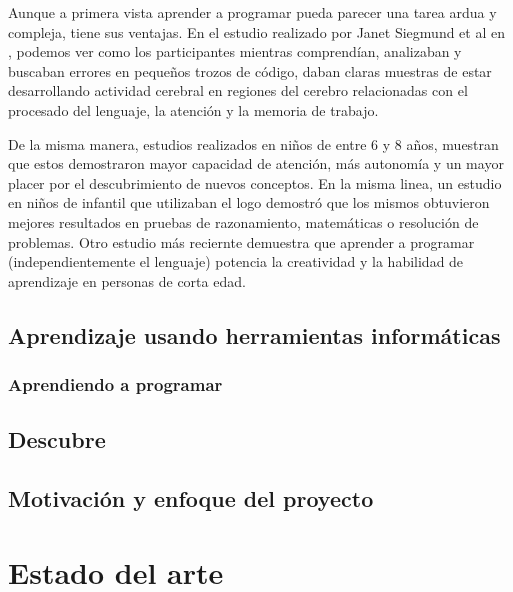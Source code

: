 Aunque a primera vista aprender a programar pueda parecer una tarea ardua y compleja, tiene sus ventajas. En el estudio realizado por Janet Siegmund {\color{red}et al} en \cite{siegmund2014understanding}, podemos ver como los participantes mientras comprendían, analizaban y buscaban errores en pequeños trozos de código, daban claras muestras de estar desarrollando actividad cerebral en regiones del cerebro relacionadas con el procesado del lenguaje, la atención y la memoria de trabajo.

De la misma manera, estudios realizados en niños \cite{clements1986effects} de entre 6 y 8 años, muestran que estos demostraron mayor capacidad de atención, más autonomía y un mayor placer por el descubrimiento de nuevos conceptos. En la misma linea, un estudio en niños de infantil \cite{logo-geometry} que utilizaban el \Gls{logo} demostró que los mismos obtuvieron mejores resultados en pruebas de razonamiento, matemáticas o resolución de problemas. Otro estudio más reciernte \cite{liao1991effects} demuestra que aprender a programar (independientemente el lenguaje) potencia la creatividad y la habilidad de aprendizaje en personas de corta edad.








\section{Aprendizaje usando herramientas informáticas}
\label{sec:aprendizaje}

\subsection{Aprendiendo a programar}
\label{sub:aprendiendo-programar}

\section{Descubre}
\label{sec:descubre}


\section{Motivación y enfoque del proyecto}
\label{sec:motivacion}


\chapter{Estado del arte}\label{estado-arte}



